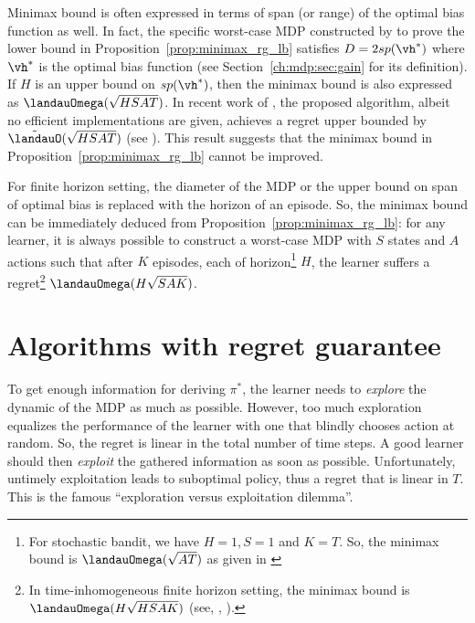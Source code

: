 Minimax bound is often expressed in terms of span (or range) of the optimal bias function as well.
In fact, the specific worst-case MDP constructed by \cite{jaksch2010near} to prove the lower bound in Proposition~\ref{prop:minimax_rg_lb} satisfies $D=2sp(\vh^*)$ where $\vh^*$ is the optimal bias function (see Section~\ref{ch:mdp:sec:gain} for its definition).
If $H$ is an upper bound on $sp(\vh^*)$, then the minimax bound is also expressed as $\landauOmega(\sqrt{HSAT})$.
In recent work of \cite{zhang2019regret}, the proposed algorithm, albeit no efficient implementations are given, achieves a regret upper bounded by $\tilde{\landauO}(\sqrt{HSAT})$ (see \cite[Theorem~1]{zhang2019regret}).
This result suggests that the minimax bound in Proposition~\ref{prop:minimax_rg_lb} cannot be improved.

For finite horizon setting, the diameter of the MDP or the upper bound on span of optimal bias is replaced with the horizon of an episode.
So, the minimax bound can be immediately deduced from Proposition~\ref{prop:minimax_rg_lb}: for any learner, it is always possible to construct a worst-case MDP with $S$ states and $A$ actions such that after $K$ episodes, each of horizon\footnote{For stochastic bandit, we have $H=1, S=1$ and $K=T$. So, the minimax bound is $\landauOmega(\sqrt{AT})$ as given in \cite{bubeck2012regret}} $H$, the learner suffers a regret\footnote{In time-inhomogeneous finite horizon setting, the minimax bound is $\landauOmega(H\sqrt{HSAK})$ (see, \eg, \cite{jin2018q, domingues2021episodic}).} $\landauOmega(H\sqrt{SAK})$.


\section{Algorithms with regret guarantee}
\label{ch:rl:sec:opt_post}

To get enough information for deriving $\pi^*$, the learner needs to \emph{explore} the dynamic of the MDP as much as possible.
However, too much exploration equalizes the performance of the learner with one that blindly chooses action at random.
So, the regret is linear in the total number of time steps.
A good learner should then \emph{exploit} the gathered information as soon as possible.
Unfortunately, untimely exploitation leads to suboptimal policy, thus a regret that is linear in $T$. This is the famous “exploration versus exploitation dilemma”.


